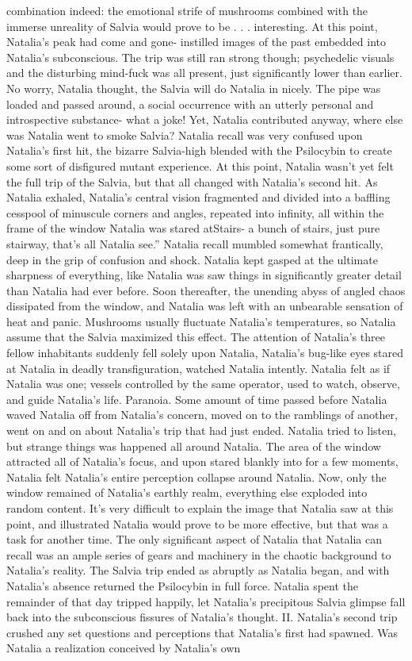 \documentclass[12pt]{book}
\begin{document}
combination indeed: the emotional strife of mushrooms combined with the immerse unreality of Salvia would prove to be . . .  interesting. At this point, Natalia's peak had come and gone- instilled images of the past embedded into Natalia's subconscious. The trip was still ran strong though; psychedelic visuals and the disturbing mind-fuck was all present, just significantly lower than earlier. No worry, Natalia thought, the Salvia will do Natalia in nicely. The pipe was loaded and passed around, a social occurrence with an utterly personal and introspective substance- what a joke! Yet, Natalia contributed anyway, where else was Natalia went to smoke Salvia? Natalia recall was very confused upon Natalia's first hit, the bizarre Salvia-high blended with the Psilocybin to create some sort of disfigured mutant experience. At this point, Natalia wasn't yet felt the full trip of the Salvia, but that all changed with Natalia's second hit. As Natalia exhaled, Natalia's central vision fragmented and divided into a baffling cesspool of minuscule corners and angles, repeated into infinity, all within the frame of the window Natalia was stared atStairs- a bunch of stairs, just pure stairway, that's all Natalia see.'' Natalia recall mumbled somewhat frantically, deep in the grip of confusion and shock. Natalia kept gasped at the ultimate sharpness of everything, like Natalia was saw things in significantly greater detail than Natalia had ever before. Soon thereafter, the unending abyss of angled chaos dissipated from the window, and Natalia was left with an unbearable sensation of heat and panic. Mushrooms usually fluctuate Natalia's temperatures, so Natalia assume that the Salvia maximized this effect. The attention of Natalia's three fellow inhabitants suddenly fell solely upon Natalia, Natalia's bug-like eyes stared at Natalia in deadly transfiguration, watched Natalia intently. Natalia felt as if Natalia was one; vessels controlled by the same operator, used to watch, observe, and guide Natalia's life. Paranoia. Some amount of time passed before Natalia waved Natalia off from Natalia's concern, moved on to the ramblings of another, went on and on about Natalia's trip that had just ended. Natalia tried to listen, but strange things was happened all around Natalia. The area of the window attracted all of Natalia's focus, and upon stared blankly into for a few moments, Natalia felt Natalia's entire perception collapse around Natalia. Now, only the window remained of Natalia's earthly realm, everything else exploded into random content. It's very difficult to explain the image that Natalia saw at this point, and illustrated Natalia would prove to be more effective, but that was a task for another time. The only significant aspect of Natalia that Natalia can recall was an ample series of gears and machinery in the chaotic background to Natalia's reality. The Salvia trip ended as abruptly as Natalia began, and with Natalia's absence returned the Psilocybin in full force. Natalia spent the remainder of that day tripped happily, let Natalia's precipitous Salvia glimpse fall back into the subconscious fissures of Natalia's thought. II. Natalia's second trip crushed any set questions and perceptions that Natalia's first had spawned. Was Natalia a realization conceived by Natalia's own 
\end{document}
